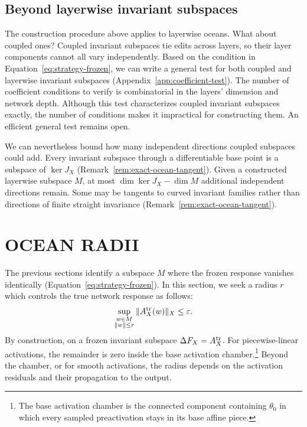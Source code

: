 \documentclass[twoside]{article}
\theoremstyle{remark}
\theoremstyle{highlightdefinition}
\theoremstyle{remark}
\begin{document}
\subsection{Beyond layerwise invariant subspaces}
\label{sec:coupled}


The construction procedure above applies to layerwise oceans. What about coupled ones?
Coupled invariant subspaces tie edits across layers, so their layer components cannot all vary independently. 
Based on the condition in Equation~\ref{eq:strategy-frozen}, we can write a general test for both coupled and layerwise invariant subspaces (Appendix~\ref{app:coefficient-test}). The number of coefficient conditions to verify is combinatorial in the layers' dimension and network depth. Although this test characterizes coupled invariant subspaces exactly, the number of conditions makes it impractical for constructing them. An efficient general test remains open. 

We can nevertheless bound how many independent directions coupled subspaces could add.  Every invariant subspace through a differentiable base point is a subspace of $\ker J_X$ (Remark~\ref{rem:exact-ocean-tangent}). Given a constructed layerwise subspace $M$, at most $\dim\ker J_X-\dim M$ additional independent directions remain. Some may be tangents to curved invariant families rather than directions of finite straight invariance (Remark~\ref{rem:exact-ocean-tangent}).



\section{OCEAN RADII}
\label{sec:radius}

The previous sections identify a subspace $M$ where the frozen response vanishes identically (Equation~\ref{eq:strategy-frozen}). In this section, we seek a radius $r$ which controls the true network response as follows: 
\[\sup_{\substack{w\in M\\\|w\|\le r}}\|A_X^{\rm tr}(w)\|_X\le\varepsilon.\]
By construction, on a frozen invariant subspace $\Delta F_X=A_X^{\rm tr}$. For piecewise-linear activations, the remainder is zero inside the base activation chamber.\footnote{The base activation chamber is the connected component containing $\theta_0$ in which every sampled preactivation stays in its base affine piece.} 
Beyond the chamber, or for smooth activations, the radius depends on the activation residuals and their propagation to the output.
\end{document}
